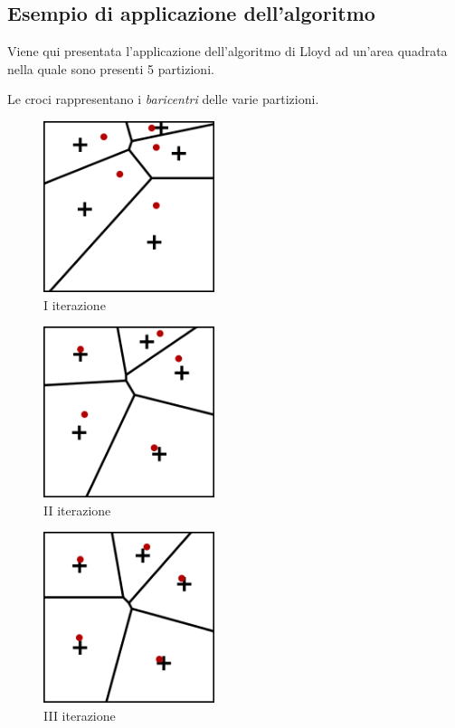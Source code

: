\documentclass[10pt,a4paper]{article}
\begin{document}
\subsection{Esempio di applicazione dell'algoritmo}

Viene qui presentata l'applicazione dell'algoritmo di Lloyd ad un'area quadrata nella quale sono presenti 5 partizioni.

Le croci rappresentano i \textit{baricentri} delle varie partizioni.

\begin{figure}[H]
\includegraphics[width=5cm]{lloyd_iterazione_1.png}
\centering
\caption{I iterazione}
\end{figure}

\begin{figure}[H]
\includegraphics[width=5cm]{lloyd_iterazione_2.png}
\centering
\caption{II iterazione}
\end{figure}

\begin{figure}[H]
\includegraphics[width=5cm]{lloyd_iterazione_3.png}
\centering
\caption{III iterazione}
\end{figure}
\end{document}

